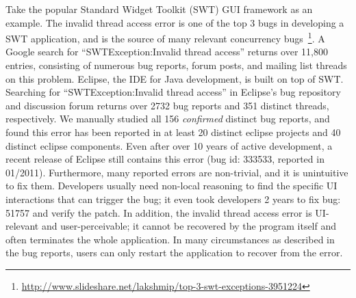 Take the popular Standard Widget Toolkit (SWT) GUI framework as an example. 
The invalid thread access error is one of the top 3 bugs in developing a SWT application, and is
the source of many relevant concurrency bugs~\footnote{\url{http://www.slideshare.net/lakshmip/top-3-swt-exceptions-3951224}}.
A Google search for ``SWTException:Invalid thread access''  returns over 11,800 entries,
consisting of numerous bug reports, forum posts, and mailing list threads on
this problem. Eclipse, the IDE for Java development, is built on top of SWT.
Searching for ``SWTException:Invalid thread access'' in Eclipse's bug repository
and discussion forum returns over 2732 bug reports and 351 distinct threads, respectively. 
We manually studied all 156 \textit{confirmed} distinct bug reports, and 
found this error has been reported in at least 20 distinct eclipse projects
and 40 distinct eclipse components. Even after over 10 years of active development,
a recent release of Eclipse still contains this error (bug id: 333533, reported in 01/2011).
 Furthermore, many reported  errors are non-trivial, and it is unintuitive
to fix them. Developers usually need non-local reasoning to find the specific
UI interactions that can trigger the bug;  it even took developers 2 years
to fix bug: 51757 and verify the patch. In addition, the invalid thread access error
is UI-relevant and user-perceivable; it cannot be recovered by the program itself
and often terminates the whole application. In many circumstances as described in the bug reports,
users can only restart the application to recover from the error.




